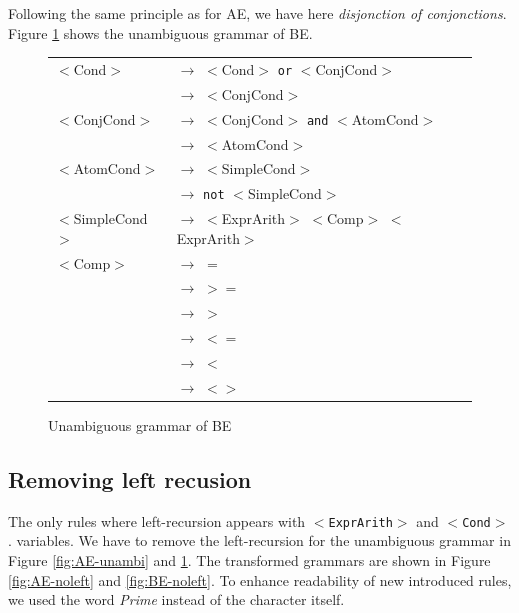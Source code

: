 \documentclass[letterpaper]{article}
\begin{document}
Following the same principle as for AE, we have here
\textit{disjonction of conjonctions}. Figure \ref{fig:BE-unambi}
shows the unambiguous grammar of BE.


\begin{figure}[H]
    \centering
    \begin{tabular}{l l}
        $<$Cond$>$ & $\rightarrow$ $<$Cond$>$ \texttt{or} $<$ConjCond$>$ \\
         & $\rightarrow$ $<$ConjCond$>$\\

        $<$ConjCond$>$ & $\rightarrow$
        $<$ConjCond$>$ \texttt{and} $<$AtomCond$>$\\
         & $\rightarrow$ $<$AtomCond$>$\\

        $<$AtomCond$>$ & $\rightarrow$ $<$SimpleCond$>$\\
         & $\rightarrow$ \texttt{not} $<$SimpleCond$>$\\

        $<$SimpleCond$>$ & $\rightarrow$
        $<$ExprArith$>$ $<$Comp$>$ $<$ExprArith$>$\\

        $<$Comp$>$ & $\rightarrow$ $=$\\
         & $\rightarrow$ $>=$\\
         & $\rightarrow$ $>$\\
         & $\rightarrow$ $<=$\\
         & $\rightarrow$ $<$\\
         & $\rightarrow$ $<>$\\
    \end{tabular}
    \caption{Unambiguous grammar of BE}
    \label{fig:BE-unambi}

\end{figure}


\subsection{Removing left recusion}

The only rules where left-recursion appears with \texttt{$<$ExprArith$>$}
and \texttt{$<$Cond$>$}.
variables. We have to remove the left-recursion for the unambiguous grammar
in Figure \ref{fig:AE-unambi} and \ref{fig:BE-unambi}. The transformed
grammars are shown in Figure \ref{fig:AE-noleft} and \ref{fig:BE-noleft}.
To enhance readability of new introduced rules,
we used the word \textit{Prime} instead of the character itself.
\end{document}
